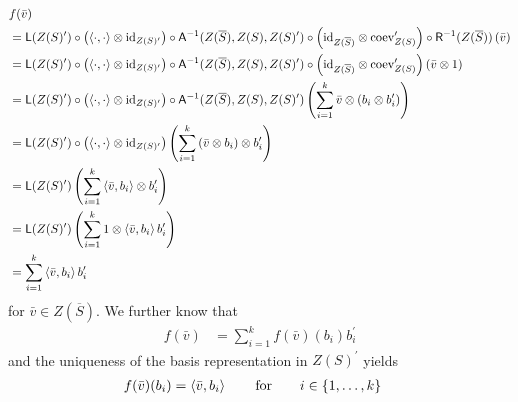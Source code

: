 \begin{align*}
  &
  f(\bar{v})
  \\
  &=
  \mathsf{L}(Z(S)^{\prime})
  \circ
  \left(
    \Braket{\cdot,\cdot}
    \otimes
    \mathrm{id}_{Z(S)^{\prime}}
  \right)
  \circ
  \mathsf{A}^{-1}(Z(\overline{S}),Z(S),Z(S)^{\prime})
  \circ
  \left(
    \mathrm{id}_{Z(\overline{S})}
    \otimes
    \mathrm{coev}_{Z(S)}^{\prime}
  \right)
  \circ
  \mathsf{R}^{-1}(Z(\overline{S}))
  \left(
    \bar{v}
  \right)
  \\
  &=
  \mathsf{L}(Z(S)^{\prime})
  \circ
  \left(
    \Braket{\cdot,\cdot}
    \otimes
    \mathrm{id}_{Z(S)^{\prime}}
  \right)
  \circ
  \mathsf{A}^{-1}(Z(\overline{S}),Z(S),Z(S)^{\prime})
  \circ
  \left(
    \mathrm{id}_{Z(\overline{S})}
    \otimes
    \mathrm{coev}_{Z(S)}^{\prime}
  \right)
  \left(
    \bar{v}
    \otimes
    1
  \right)
  \\
  &=
  \mathsf{L}(Z(S)^{\prime})
  \circ
  \left(
    \Braket{\cdot,\cdot}
    \otimes
    \mathrm{id}_{Z(S)^{\prime}}
  \right)
  \circ
  \mathsf{A}^{-1}(Z(\overline{S}),Z(S),Z(S)^{\prime})
  \left(
    \sum_{i=1}^{k}
    \bar{v}
    \otimes
    \left(
      b_{i}
      \otimes
      b_{i}^{\prime}
    \right)
  \right)
  \\
  &=
  \mathsf{L}(Z(S)^{\prime})
  \circ
  \left(
    \Braket{\cdot,\cdot}
    \otimes
    \mathrm{id}_{Z(S)^{\prime}}
  \right)
  \left(
    \sum_{i=1}^{k}
    \left(
      \bar{v}
      \otimes
      b_{i}
    \right)
    \otimes
    b_{i}^{\prime}
  \right)
  \\
  &=
  \mathsf{L}(Z(S)^{\prime})
  \left(
    \sum_{i=1}^{k}
    \Braket{\bar{v},b_{i}}
    \otimes
    b_{i}^{\prime}
  \right)
  \\
  &=
  \mathsf{L}(Z(S)^{\prime})
  \left(
    \sum_{i=1}^{k}
    1
    \otimes
    \Braket{\bar{v},b_{i}}
    b_{i}^{\prime}
  \right)
  \\
  &=
  \sum_{i = 1}^{k}
  \Braket{\bar{v},b_{i}}
  b_{i}^{\prime}
\end{align*}
for $\bar{v} \in Z(\overline{S})$. We further know that
\begin{align*}
  f(\bar{v})
  &=
  \sum_{i = 1}^{k}
  f(\bar{v})(b_{i})
  b_{i}^{\prime}
\end{align*}
and the uniqueness of the basis representation in $Z(S)^{\prime}$ yields
\begin{align*}
  f(\bar{v})(b_{i})
  &=
  \Braket{\bar{v},b_{i}}
  \qquad
  \text{for}
  \qquad
  i
  \in
  \lbrace
    1
    ,
    \ldots
    ,
    k
  \rbrace
\end{align*}
